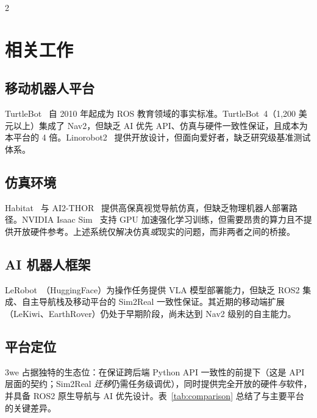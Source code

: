 \documentclass[UTF8]{ctexart}
\begin{document}
\begin{multicols}{2}
\section{相关工作}

\subsection{移动机器人平台}

TurtleBot~\cite{turtlebot} 自 2010 年起成为 ROS 教育领域的事实标准。TurtleBot~4（1,200 美元以上）集成了 Nav2，但缺乏 AI 优先 API、仿真与硬件一致性保证，且成本为本平台的 4 倍。Linorobot2~\cite{linorobot} 提供开放设计，但面向爱好者，缺乏研究级基准测试体系。

\subsection{仿真环境}

Habitat~\cite{savva2019habitat} 与 AI2-THOR~\cite{kolve2017ai2thor} 提供高保真视觉导航仿真，但缺乏物理机器人部署路径。NVIDIA Isaac Sim~\cite{nvidia2023isaac} 支持 GPU 加速强化学习训练，但需要昂贵的算力且不提供开放硬件参考。上述系统仅解决仿真\emph{或}现实的问题，而非两者之间的桥接。

\subsection{AI 机器人框架}

LeRobot~\cite{cadene2024lerobot}（HuggingFace）为操作任务提供 VLA 模型部署能力，但缺乏 ROS2 集成、自主导航栈及移动平台的 Sim2Real 一致性保证。其近期的移动端扩展（LeKiwi、EarthRover）仍处于早期阶段，尚未达到 Nav2 级别的自主能力。

\subsection{平台定位}

3we 占据独特的生态位：在保证跨后端 Python API 一致性的前提下（这是 API 层面的契约；Sim2Real \emph{迁移}仍需任务级调优），同时提供完全开放的硬件\emph{与}软件，并具备 ROS2 原生导航与 AI 优先设计。表~\ref{tab:comparison} 总结了与主要平台的关键差异。


\end{multicols}
\end{document}
